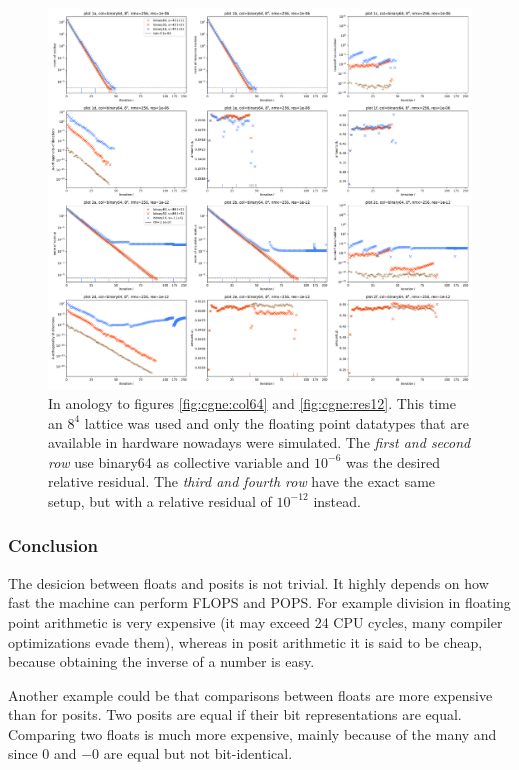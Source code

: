 \documentclass{article}
\theoremstyle{plain} %
\theoremstyle{remark} %
\numberwithin{equation}{section}
\begin{document}
\begin{figure}
    \centering
    \includegraphics[width=1.0\textwidth]{plots/cgne_8x8x8x8_new}
    \caption{In anology to figures \ref{fig:cgne:col64} and \ref{fig:cgne:res12}. This time an $8^4$ lattice was used and only the floating point datatypes that are available in hardware nowadays were simulated. The \textit{first and second row} use \gls{binary64} as collective variable and $10^{-6}$ was the desired relative residual. The \textit{third and fourth row} have the exact same setup, but with a relative residual of $10^{-12}$ instead.}
    \label{fig:cgne8}
\end{figure}

\subsubsection{Conclusion}

The desicion between floats and posits is not trivial. It highly depends on how fast the machine can perform \acrshort{FLOPS} and \acrshort{POPS}. For example division in floating point arithmetic is very expensive (it may exceed \num{24} CPU cycles, many compiler optimizations evade them), whereas in posit arithmetic it is said to be cheap, because obtaining the inverse of a number is easy.

Another example could be that comparisons between floats are more expensive than for posits. Two posits are equal if their bit representations are equal. Comparing two floats is much more expensive, mainly because of the many  and since $0$ and $-0$ are equal but not bit-identical.
\end{document}
